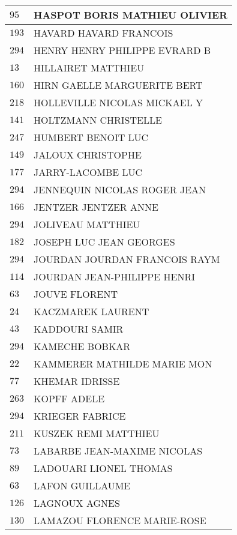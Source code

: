 \begin{xltabular}{\linewidth}{|l|X|}
    \hline
    $95$ & HASPOT BORIS MATHIEU OLIVIER \\
    \hline
    $193$ & HAVARD HAVARD FRANCOIS \\
    \hline
    $294$ & HENRY HENRY PHILIPPE EVRARD B \\
    \hline
    $13$ & HILLAIRET MATTHIEU \\
    \hline
    $160$ & HIRN GAELLE MARGUERITE BERT \\
    \hline
    $218$ & HOLLEVILLE NICOLAS MICKAEL Y \\
    \hline
    $141$ & HOLTZMANN CHRISTELLE \\
    \hline
    $247$ & HUMBERT BENOIT LUC \\
    \hline
    $149$ & JALOUX CHRISTOPHE \\
    \hline
    $177$ & JARRY-LACOMBE LUC \\
    \hline
    $294$ & JENNEQUIN NICOLAS ROGER JEAN \\
    \hline
    $166$ & JENTZER JENTZER ANNE \\
    \hline
    $294$ & JOLIVEAU MATTHIEU \\
    \hline
    $182$ & JOSEPH LUC JEAN GEORGES \\
    \hline
    $294$ & JOURDAN JOURDAN FRANCOIS RAYM \\
    \hline
    $114$ & JOURDAN JEAN-PHILIPPE HENRI \\
    \hline
    $63$ & JOUVE FLORENT \\
    \hline
    $24$ & KACZMAREK LAURENT \\
    \hline
    $43$ & KADDOURI SAMIR \\
    \hline
    $294$ & KAMECHE BOBKAR \\
    \hline
    $22$ & KAMMERER MATHILDE MARIE MON \\
    \hline
    $77$ & KHEMAR IDRISSE \\
    \hline
    $263$ & KOPFF ADELE \\
    \hline
    $294$ & KRIEGER FABRICE \\
    \hline
    $211$ & KUSZEK REMI MATTHIEU \\
    \hline
    $73$ & LABARBE JEAN-MAXIME NICOLAS \\
    \hline
    $89$ & LADOUARI LIONEL THOMAS \\
    \hline
    $63$ & LAFON GUILLAUME \\
    \hline
    $126$ & LAGNOUX AGNES \\
    \hline
    $130$ & LAMAZOU FLORENCE MARIE-ROSE \\

\end{xltabular}
